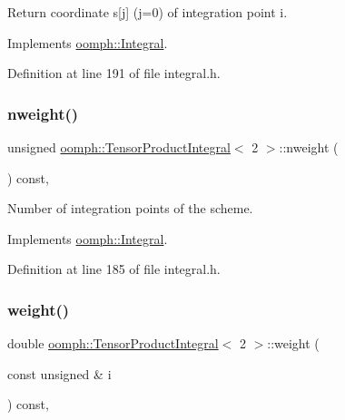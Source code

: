 Return coordinate s\mbox{[}j\mbox{]} (j=0) of integration point i. 



Implements \hyperlink{classoomph_1_1Integral_a1a2122f99a87c18649bafdd9ed739758}{oomph\+::\+Integral}.



Definition at line 191 of file integral.\+h.

\mbox{\label{classoomph_1_1TensorProductIntegral_3_012_01_4_aedb21a4d22fa37fb53b570aa6acc4ba3}} 
\subsubsection{\texorpdfstring{nweight()}{nweight()}}
{\footnotesize\ttfamily unsigned \hyperlink{classoomph_1_1TensorProductIntegral}{oomph\+::\+Tensor\+Product\+Integral}$<$ 2 $>$\+::nweight (\begin{DoxyParamCaption}{ }\end{DoxyParamCaption}) const\hspace{0.3cm}{\ttfamily [inline]}, {\ttfamily [virtual]}}



Number of integration points of the scheme. 



Implements \hyperlink{classoomph_1_1Integral_a1a270de9d99a1fcf1d25a6c1017f65fa}{oomph\+::\+Integral}.



Definition at line 185 of file integral.\+h.

\mbox{\label{classoomph_1_1TensorProductIntegral_3_012_01_4_af9743733736f681784e675436a8dd20a}} 
\subsubsection{\texorpdfstring{weight()}{weight()}}
{\footnotesize\ttfamily double \hyperlink{classoomph_1_1TensorProductIntegral}{oomph\+::\+Tensor\+Product\+Integral}$<$ 2 $>$\+::weight (\begin{DoxyParamCaption}\item[{const unsigned \&}]{i }\end{DoxyParamCaption}) const\hspace{0.3cm}{\ttfamily [inline]}, {\ttfamily [virtual]}}



